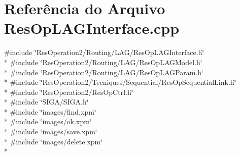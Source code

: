 \section{Referência do Arquivo Res\+Op\+L\+A\+G\+Interface.\+cpp}
\label{_res_op_l_a_g_interface_8cpp}
{\ttfamily \#include \char`\"{}Res\+Operation2/\+Routing/\+L\+A\+G/\+Res\+Op\+L\+A\+G\+Interface.\+h\char`\"{}}\\*
{\ttfamily \#include \char`\"{}Res\+Operation2/\+Routing/\+L\+A\+G/\+Res\+Op\+L\+A\+G\+Model.\+h\char`\"{}}\\*
{\ttfamily \#include \char`\"{}Res\+Operation2/\+Routing/\+L\+A\+G/\+Res\+Op\+L\+A\+G\+Param.\+h\char`\"{}}\\*
{\ttfamily \#include \char`\"{}Res\+Operation2/\+Tecniques/\+Sequential/\+Res\+Op\+Sequential\+Link.\+h\char`\"{}}\\*
{\ttfamily \#include \char`\"{}Res\+Operation2/\+Res\+Op\+Ctrl.\+h\char`\"{}}\\*
{\ttfamily \#include \char`\"{}S\+I\+G\+A/\+S\+I\+G\+A.\+h\char`\"{}}\\*
{\ttfamily \#include \char`\"{}images/find.\+xpm\char`\"{}}\\*
{\ttfamily \#include \char`\"{}images/ok.\+xpm\char`\"{}}\\*
{\ttfamily \#include \char`\"{}images/save.\+xpm\char`\"{}}\\*
{\ttfamily \#include \char`\"{}images/delete.\+xpm\char`\"{}}\\*
